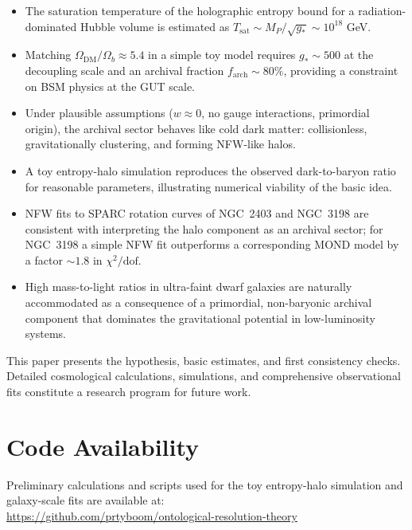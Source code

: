 \documentclass[11pt,a4paper]{article}
\begin{document}
\begin{itemize}
\item The saturation temperature of the holographic entropy bound for a radiation-dominated Hubble volume is estimated as $T_{\mathrm{sat}} \sim M_P/\sqrt{g_*} \sim 10^{18}$ GeV.

\item Matching $\Omega_{\mathrm{DM}}/\Omega_b \approx 5.4$ in a simple toy model requires $g_* \sim 500$ at the decoupling scale and an archival fraction $f_{\mathrm{arch}} \sim 80\%$, providing a constraint on BSM physics at the GUT scale.

\item Under plausible assumptions ($w \approx 0$, no gauge interactions, primordial origin), the archival sector behaves like cold dark matter: collisionless, gravitationally clustering, and forming NFW-like halos.

\item A toy entropy-halo simulation reproduces the observed dark-to-baryon ratio for reasonable parameters, illustrating numerical viability of the basic idea.

\item NFW fits to SPARC rotation curves of NGC~2403 and NGC~3198 are consistent with interpreting the halo component as an archival sector; for NGC~3198 a simple NFW fit outperforms a corresponding MOND model by a factor $\sim 1.8$ in $\chi^2/\mathrm{dof}$.

\item High mass-to-light ratios in ultra-faint dwarf galaxies are naturally accommodated as a consequence of a primordial, non-baryonic archival component that dominates the gravitational potential in low-luminosity systems.
\end{itemize}

This paper presents the hypothesis, basic estimates, and first consistency checks. Detailed cosmological calculations, simulations, and comprehensive observational fits constitute a research program for future work.

\section*{Code Availability}

Preliminary calculations and scripts used for the toy entropy-halo simulation and galaxy-scale fits are available at:\\[0.3em]
\url{https://github.com/prtyboom/ontological-resolution-theory}
\end{document}
